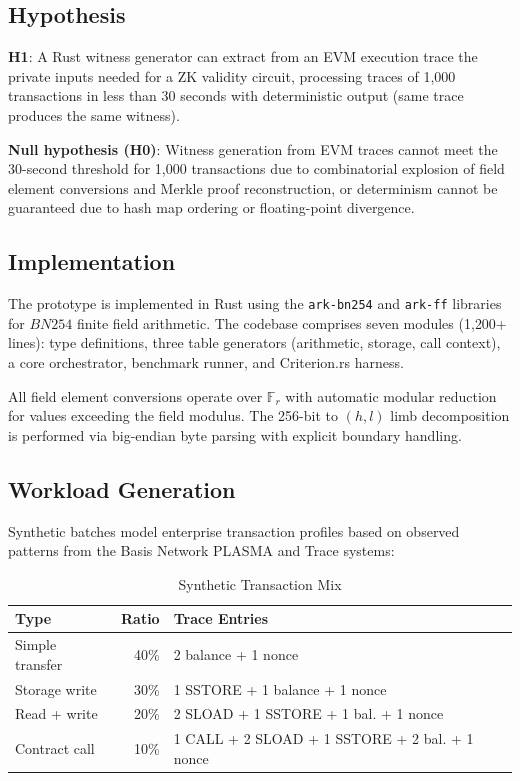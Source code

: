 \documentclass[conference]{IEEEtran}
\newcommand{\Fr}{\mathbb{F}_r}
\newcommand{\bn}{BN254}
\begin{document}
\subsection{Hypothesis}

\textbf{H1}: A Rust witness generator can extract from an EVM execution
trace the private inputs needed for a ZK validity circuit, processing
traces of 1{,}000 transactions in less than 30 seconds with
deterministic output (same trace produces the same witness).

\textbf{Null hypothesis (H0)}: Witness generation from EVM traces
cannot meet the 30-second threshold for 1{,}000 transactions due to
combinatorial explosion of field element conversions and Merkle proof
reconstruction, or determinism cannot be guaranteed due to hash map
ordering or floating-point divergence.

\subsection{Implementation}

The prototype is implemented in Rust using the \texttt{ark-bn254} and
\texttt{ark-ff} libraries~\cite{ark-works-2022} for $\bn{}$ finite
field arithmetic. The codebase comprises seven modules (1{,}200+ lines):
type definitions, three table generators (arithmetic, storage, call
context), a core orchestrator, benchmark runner, and Criterion.rs
harness.

All field element conversions operate over $\Fr$ with automatic modular
reduction for values exceeding the field modulus. The 256-bit to
$(h, l)$ limb decomposition is performed via big-endian byte parsing
with explicit boundary handling.

\subsection{Workload Generation}

Synthetic batches model enterprise transaction profiles based on
observed patterns from the Basis Network PLASMA and Trace systems:

\begin{table}[htbp]
\caption{Synthetic Transaction Mix}
\label{tab:tx-mix}
\centering
\begin{tabular}{lrl}
\toprule
\textbf{Type} & \textbf{Ratio} & \textbf{Trace Entries} \\
\midrule
Simple transfer  & 40\% & 2 balance + 1 nonce \\
Storage write    & 30\% & 1 SSTORE + 1 balance + 1 nonce \\
Read + write     & 20\% & 2 SLOAD + 1 SSTORE + 1 bal. + 1 nonce \\
Contract call    & 10\% & 1 CALL + 2 SLOAD + 1 SSTORE + 2 bal. + 1 nonce \\
\bottomrule
\end{tabular}
\end{table}
\end{document}
